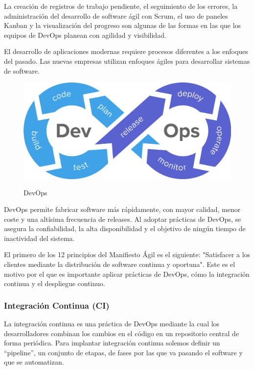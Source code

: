 \documentclass[12pt,twoside,titlepage]{report}
\begin{document}
La creación de registros de trabajo pendiente, el seguimiento de los errores, la administración del desarrollo de software ágil con Scrum, el uso de paneles Kanban y la visualización del progreso son algunas de las formas en las que los equipos de DevOps planean con agilidad y visibilidad.

El desarrollo de aplicaciones modernas requiere procesos diferentes a los enfoques del pasado. Las nuevas empresas utilizan enfoques ágiles para desarrollar sistemas de software.

\begin{figure}[H]
    \centering
    \includegraphics[scale=0.24]{DevOps}
    \label{fig:DevOps}
    \caption{DevOps}
\end{figure}

DevOps permite fabricar software más rápidamente, con mayor calidad, menor coste y una altísima frecuencia de releases. Al adoptar prácticas de DevOps, se asegura la confiabilidad, la alta disponibilidad y el objetivo de ningún tiempo de inactividad del sistema.

El primero de los 12 principios del Manifiesto Ágil es el siguiente: "Satisfacer a los clientes mediante la distribución de software continua y oportuna". Este es el motivo por el que es importante aplicar prácticas de DevOps, cómo la integración continua y el despliegue continuo.

\subsubsection{Integración Continua (CI)}

La integración continua es una práctica de DevOps mediante la cual los desarrolladores combinan los cambios en el código en un repositorio central de forma periódica. Para implantar integración continua solemos definir un “pipeline”, un conjunto de etapas, de fases por las que va pasando el software y que se automatizan. 
\end{document}
